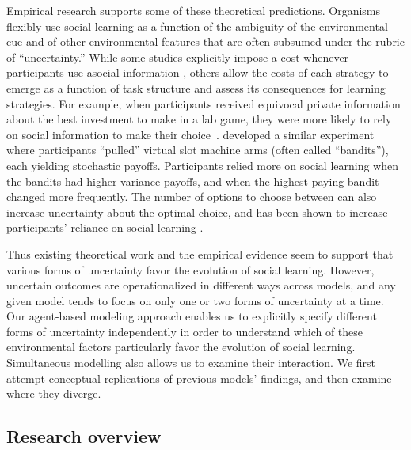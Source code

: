 \documentclass[letterpaper,11.5pt]{scrartcl}
\begin{document}
Empirical research supports some of these theoretical predictions. Organisms flexibly use social learning as a function of the ambiguity of the environmental cue and of other environmental features that are often subsumed under the rubric of ``uncertainty.''
While some studies explicitly impose a cost whenever participants use asocial
information \cite{Morgan2012,Atkisson2012}, 
others allow the costs of each strategy to emerge as a function of task structure and assess its consequences for learning strategies. 
For example, when participants received equivocal private information about the best investment to make in a lab game,
they were more likely to rely on social information to make their choice~\cite{Toelch2013}. 
 developed a similar experiment where participants ``pulled'' virtual slot machine arms (often called ``bandits''), each yielding stochastic payoffs. Participants relied more on social learning when the bandits had higher-variance payoffs, and when the highest-paying bandit changed more frequently. 
The number of options to choose between can also increase uncertainty about the optimal choice, and has been shown to increase participants' reliance on social learning \cite{Muthukrishna2016a}. 

Thus existing theoretical work and the empirical evidence seem to support that various forms of uncertainty favor the evolution of social learning. However, uncertain outcomes are operationalized in different ways across models, and any given model tends to focus on only one or two forms of uncertainty at a time. Our agent-based modeling approach enables us to explicitly specify different forms of uncertainty independently in order to understand which of these environmental factors particularly favor the evolution of social learning. Simultaneous modelling also allows us to examine their interaction. We first attempt conceptual replications of previous models' findings, and then examine where they diverge.

\subsection{Research overview}
\end{document}
